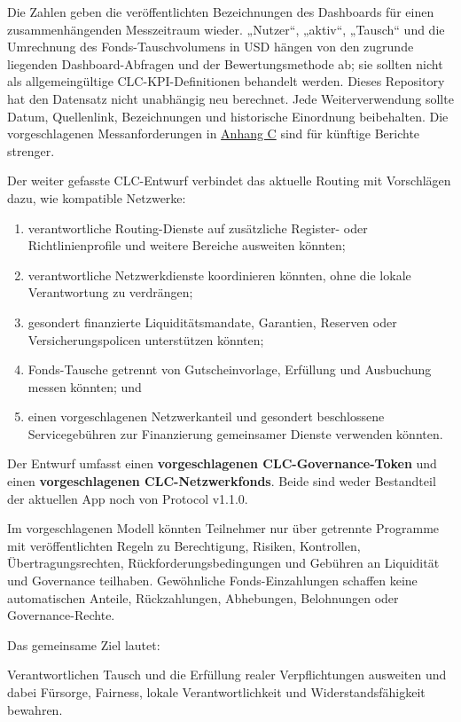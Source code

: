 \documentclass[11pt]{article}
\begin{document}
Die Zahlen geben die veröffentlichten Bezeichnungen des Dashboards für einen zusammenhängenden Messzeitraum wieder. „Nutzer``, „aktiv``, „Tausch`` und die Umrechnung des Fonds-Tauschvolumens in USD hängen von den zugrunde liegenden Dashboard-Abfragen und der Bewertungsmethode ab; sie sollten nicht als allgemeingültige CLC-KPI-Definitionen behandelt werden. Dieses Repository hat den Datensatz nicht unabhängig neu berechnet. Jede Weiterverwendung sollte Datum, Quellenlink, Bezeichnungen und historische Einordnung beibehalten. Die vorgeschlagenen Messanforderungen in \href{https://docs.cosmolocal.credit/de/white-paper/appendix-c-kpi-definitions}{Anhang C} sind für künftige Berichte strenger.

Der weiter gefasste CLC-Entwurf verbindet das aktuelle Routing mit Vorschlägen dazu, wie kompatible Netzwerke:

\begin{enumerate}[leftmargin=*]
\item verantwortliche Routing-Dienste auf zusätzliche Register- oder Richtlinienprofile und weitere Bereiche ausweiten könnten;
\item verantwortliche Netzwerkdienste koordinieren könnten, ohne die lokale Verantwortung zu verdrängen;
\item gesondert finanzierte Liquiditätsmandate, Garantien, Reserven oder Versicherungspolicen unterstützen könnten;
\item Fonds-Tausche getrennt von Gutscheinvorlage, Erfüllung und Ausbuchung messen könnten; und
\item einen vorgeschlagenen Netzwerkanteil und gesondert beschlossene Servicegebühren zur Finanzierung gemeinsamer Dienste verwenden könnten.
\end{enumerate}
Der Entwurf umfasst einen \textbf{vorgeschlagenen CLC-Governance-Token} und einen \textbf{vorgeschlagenen CLC-Netzwerkfonds}. Beide sind weder Bestandteil der aktuellen App noch von Protocol v1.1.0.

Im vorgeschlagenen Modell könnten Teilnehmer nur über getrennte Programme mit veröffentlichten Regeln zu Berechtigung, Risiken, Kontrollen, Übertragungsrechten, Rückforderungsbedingungen und Gebühren an Liquidität und Governance teilhaben. Gewöhnliche Fonds-Einzahlungen schaffen keine automatischen Anteile, Rückzahlungen, Abhebungen, Belohnungen oder Governance-Rechte.

Das gemeinsame Ziel lautet:

Verantwortlichen Tausch und die Erfüllung realer Verpflichtungen ausweiten und dabei Fürsorge, Fairness, lokale Verantwortlichkeit und Widerstandsfähigkeit bewahren.
\end{document}
